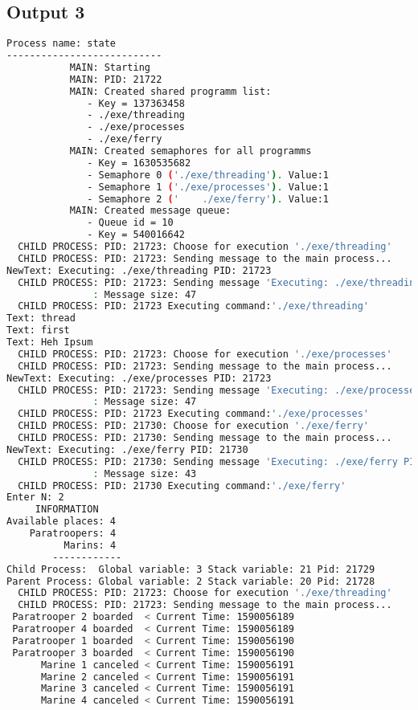 \documentclass{article}
\begin{document}
\subsection{Output 3}
\begin{lstlisting}[language=BASH]
   Process name: state
---------------------------
           MAIN: Starting
           MAIN: PID: 21722
           MAIN: Created shared programm list:
              - Key = 137363458
              - ./exe/threading
              - ./exe/processes
              - ./exe/ferry
           MAIN: Created semaphores for all programms
              - Key = 1630535682
              - Semaphore 0 ('./exe/threading'). Value:1
              - Semaphore 1 ('./exe/processes'). Value:1
              - Semaphore 2 ('    ./exe/ferry'). Value:1
           MAIN: Created message queue:
              - Queue id = 10
              - Key = 540016642
  CHILD PROCESS: PID: 21723: Choose for execution './exe/threading'
  CHILD PROCESS: PID: 21723: Sending message to the main process...
NewText: Executing: ./exe/threading PID: 21723
  CHILD PROCESS: PID: 21723: Sending message 'Executing: ./exe/threading PID: 21723' to the MAIN process...
               : Message size: 47
  CHILD PROCESS: PID: 21723 Executing command:'./exe/threading'
Text: thread
Text: first
Text: Heh Ipsum
  CHILD PROCESS: PID: 21723: Choose for execution './exe/processes'
  CHILD PROCESS: PID: 21723: Sending message to the main process...
NewText: Executing: ./exe/processes PID: 21723
  CHILD PROCESS: PID: 21723: Sending message 'Executing: ./exe/processes PID: 21723' to the MAIN process...
               : Message size: 47
  CHILD PROCESS: PID: 21723 Executing command:'./exe/processes'
  CHILD PROCESS: PID: 21730: Choose for execution './exe/ferry'
  CHILD PROCESS: PID: 21730: Sending message to the main process...
NewText: Executing: ./exe/ferry PID: 21730
  CHILD PROCESS: PID: 21730: Sending message 'Executing: ./exe/ferry PID: 21730' to the MAIN process...
               : Message size: 43
  CHILD PROCESS: PID: 21730 Executing command:'./exe/ferry'
Enter N: 2
     INFORMATION
Available places: 4
    Paratroopers: 4
          Marins: 4
        ------------
Child Process:  Global variable: 3 Stack variable: 21 Pid: 21729
Parent Process: Global variable: 2 Stack variable: 20 Pid: 21728
  CHILD PROCESS: PID: 21723: Choose for execution './exe/threading'
  CHILD PROCESS: PID: 21723: Sending message to the main process...
 Paratrooper 2 boarded  < Current Time: 1590056189 
 Paratrooper 4 boarded  < Current Time: 1590056189 
 Paratrooper 1 boarded  < Current Time: 1590056190 
 Paratrooper 3 boarded  < Current Time: 1590056190 
      Marine 1 canceled < Current Time: 1590056191 
      Marine 2 canceled < Current Time: 1590056191 
      Marine 3 canceled < Current Time: 1590056191 
      Marine 4 canceled < Current Time: 1590056191 


\end{lstlisting}
\end{document}
